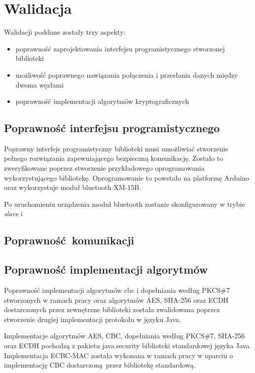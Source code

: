 \chapter{Walidacja}
\label{cha:walidacja}

Walidacji poddane zostały trzy aspekty:

\begin{itemize}
\item poprawność zaprojektowania interfejsu programistycznego stworzonej biblioteki
\item możliwość poprawnego nawiązania połączenia i przesłania danych między dwoma węzłami
\item poprawność implementacji algorytmów kryptograficznych
\end{itemize}

\section{Poprawność interfejsu programistycznego}

Poprawny interfejs programistyczny biblioteki musi umożliwiać stworzenie pełnego rozwiązania zapewniającego bezpieczną komunikację. Zostało to zweryfikowane poprzez stworzenie przykładowego oprogramowania wykorzystującego bibliotekę. Oprogramowanie to powstało na platformę Arduino oraz wykorzystuje moduł bluetooth XM-15B.

Po uruchomieniu urządzenia moduł bluetooth zostanie skonfigurowany w trybie \emph{slave} i 

\section{Poprawność komunikacji}

\section{Poprawność implementacji algorytmów}

Poprawność implementacji algorytmów \gls{cbc} i dopełniania według PKCS\#7 stworzonych w ramach pracy oraz algorytmów AES, SHA-256 oraz ECDH dostarczonych przez zewnętrzne biblioteki została zwalidowana poprzez stworzenie drugiej implementacji protokołu w języku Java.

Implementacje algorytmów AES, CBC, dopełniania według PKCS\#7, SHA-256 oraz ECDH pochodzą z pakietu java.security biblioteki standardowej języka Java. Implementacja ECBC-MAC została wykonana w ramach pracy w oparciu o implementację CBC dostarczoną przez bibliotekę standardową.
